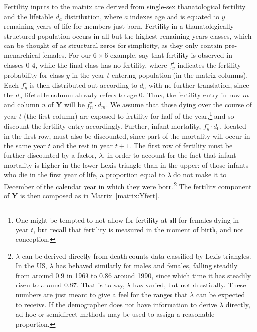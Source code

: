 \documentclass{article}
\begin{document}
 Fertility inputs to the matrix are derived from single-sex thanatological
 fertility and the lifetable $d_a$ distribution, where $a$ indexes age and is
 equated to $y$ remaining years of life for members just born. Fertility
 in a thanatologically structured population occurs in all but the highest
 remaining years classes, which can be thought of as structural zeros for
 simplicity, as they only contain pre-menarchical females. For our
 $6\times 6$ example, say that fertility is observed in classes 0-4, while the
 final class has no fertility, where $f^\star_y$ indicates the fertility
 probability for class $y$ in the year $t$ entering population (in the matrix
 columns). Each $f^\star_y$ is then distributed out according to $d_a$ with no
 further translation, since the $d_a$ lifetable column already refers to age 0. Thus, the fertility entry in row $m$ and column $n$ of $\textbf{Y}$ will be $f^\star_n \cdot d_m$. We assume that those dying over the course of year
 $t$ (the first column) are exposed to fertility for half of the
 year,\footnote{One might be tempted to not allow for fertility at all for
 females dying in year $t$, but recall that fertility is measured in the moment of
 birth, and not conception.}
 and so discount the fertility entry accordingly. Further, infant mortality, 
 $f^\star_y \cdot d_0$, located in the first row, must also be discounted, since part
 of the mortality will occur in the same year $t$ and the rest in year $t + 1$. 
 The first row of fertility must be further discounted by a factor, $\lambda$,
 in order to account for the fact that infant mortality is higher in the lower Lexis 
 triangle than in the upper: of those infants who die in the first year of life, a proportion equal to
 $\lambda$ do not make it to December  of the calendar year in which
 they were born.\footnote{$\lambda$ can be derived directly from death counts
 data classified by Lexis triangles. In the US, $\lambda$ has behaved similarly
 for males and females, falling steadily from around $0.9$ in 1969 to $0.86$
 around 1990, since which time it has steadily risen to around $0.87$. That is
 to say, $\lambda$ has varied, but not drastically. These numbers are just meant to give a
feel for the ranges that $\lambda$ can be expected to receive. If the demographer
 does not have information to derive $\lambda$ directly, ad hoc or semidirect
 methods may be used to assign a reasonable proportion. } The
 fertility component of $\textbf{Y}$ is then composed as in Matrix~\ref{matrix:Yfert}.
\end{document}
